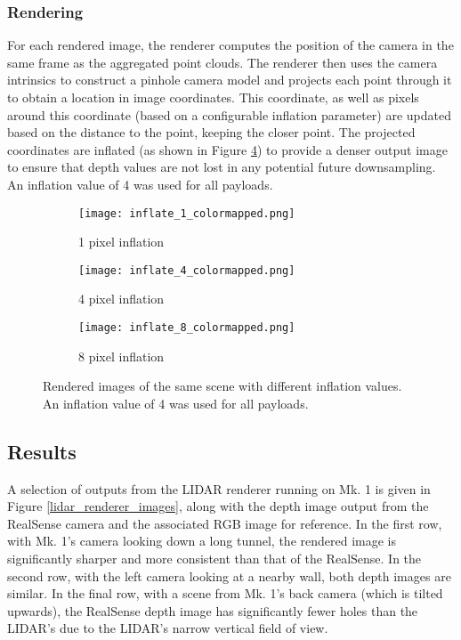 \subsubsection{Rendering}
For each rendered image, the renderer computes the position of the camera in the same frame as the aggregated point clouds. The renderer then uses the camera intrinsics to construct a pinhole camera model and projects each point through it to obtain a location in image coordinates. This coordinate, as well as pixels around this coordinate (based on a configurable inflation parameter) are updated based on the distance to the point, keeping the closer point. The projected coordinates are inflated (as shown in Figure \ref{lidar_inflate}) to provide a denser output image to ensure that depth values are not lost in any potential future downsampling. An inflation value of 4 was used for all payloads.

\begin{figure}
	\centering
	\begin{subfigure}{0.32\textwidth}
		\texttt{[image: inflate\_1\_colormapped.png]}
		\caption{1 pixel inflation}
		\label{inflate_1}
	\end{subfigure}		
	\hfill
	\begin{subfigure}{0.32\textwidth}
		\texttt{[image: inflate\_4\_colormapped.png]}
		\caption{4 pixel inflation}
		\label{inflate_4}		
	\end{subfigure}
	\hfill
	\begin{subfigure}{0.32\textwidth}
		\texttt{[image: inflate\_8\_colormapped.png]}
		\caption{8 pixel inflation}
		\label{inflate_8}
	\end{subfigure}
	\caption[LIDAR renderer inflation values comparison]{Rendered images of the same scene with different inflation values. An inflation value of 4 was used for all payloads.}
	\label{lidar_inflate}
\end{figure}

\subsection{Results}

A selection of outputs from the LIDAR renderer running on Mk. 1 is given in Figure \ref{lidar_renderer_images}, along with the depth image output from the RealSense camera and the associated RGB image for reference. In the first row, with Mk. 1's camera looking down a long tunnel, the rendered image is significantly sharper and more consistent than that of the RealSense. In the second row, with the left camera looking at a nearby wall, both depth images are similar. In the final row, with a scene from Mk. 1's back camera (which is tilted upwards), the RealSense depth image has significantly fewer holes than the LIDAR's due to the LIDAR's narrow vertical field of view. 

